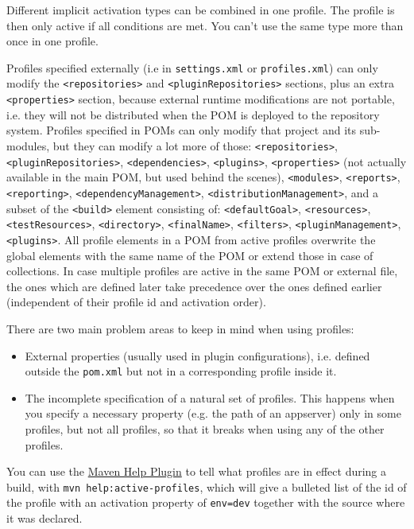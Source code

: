 \documentclass[8pt, table, xcdraw]{article}%
\begin{document}
Different implicit activation types can be combined in one profile. The profile is then only active if all conditions are met. You can't use the same type more than once in one profile.

Profiles specified externally (i.e in \lstinline{settings.xml} or \lstinline{profiles.xml}) can only modify the \lstinline{<repositories>} and \lstinline{<pluginRepositories>} sections, plus an extra \lstinline{<properties>} section, because external runtime modifications are not portable, i.e. they will not be distributed when the POM is deployed to the repository system. Profiles specified in POMs can only modify that project and its sub-modules, but they can modify a lot more of those: \lstinline{<repositories>},\lstinline{<pluginRepositories>}, \lstinline{<dependencies>}, \lstinline{<plugins>}, \lstinline{<properties>} (not actually available in the main POM, but used behind the scenes), \lstinline{<modules>}, \lstinline{<reports>}, \lstinline{<reporting>}, \lstinline{<dependencyManagement>}, \lstinline{<distributionManagement>}, and a subset of the \lstinline{<build>} element consisting of: \lstinline{<defaultGoal>}, \lstinline{<resources>}, \lstinline{<testResources>}, \lstinline{<directory>}, \lstinline{<finalName>}, \lstinline{<filters>}, \lstinline{<pluginManagement>}, \lstinline{<plugins>}. All profile elements in a POM from active profiles overwrite the global elements with the same name of the POM or extend those in case of collections. In case multiple profiles are active in the same POM or external file, the ones which are defined later take precedence over the ones defined earlier (independent of their profile id and activation order).

There are two main problem areas to keep in mind when using profiles:

\begin{itemize}
    \item External properties (usually used in plugin configurations), i.e. defined outside the \lstinline{pom.xml} but not in a corresponding profile inside it.
    \item The incomplete specification of a natural set of profiles. This happens when you specify a necessary property (e.g. the path of an appserver) only in some profiles, but not all profiles, so that it breaks when using any of the other profiles.
\end{itemize}

You can use the \href{https://maven.apache.org/plugins/maven-help-plugin/}{Maven Help Plugin} to tell what profiles are in effect during a build, with \lstinline{mvn help:active-profiles}, which will give a bulleted list of the id of the profile with an activation property of \lstinline{env=dev} together with the source where it was declared.
\end{document}
